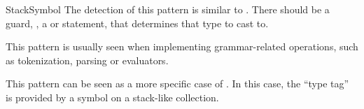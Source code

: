 \begin{pattern}{StackSymbol}
\detection{}
The detection of this pattern is similar to .
There should be a guard, \eg, a  or  statement,
that determines that type to cast to.

\discussion{}
This pattern is usually seen when implementing grammar-related operations,
such as tokenization, parsing or evaluators.

\related{}
This pattern can be seen as a more specific case of .
In this case, the ``type tag'' is provided by a symbol on a stack-like collection.

\end{pattern}